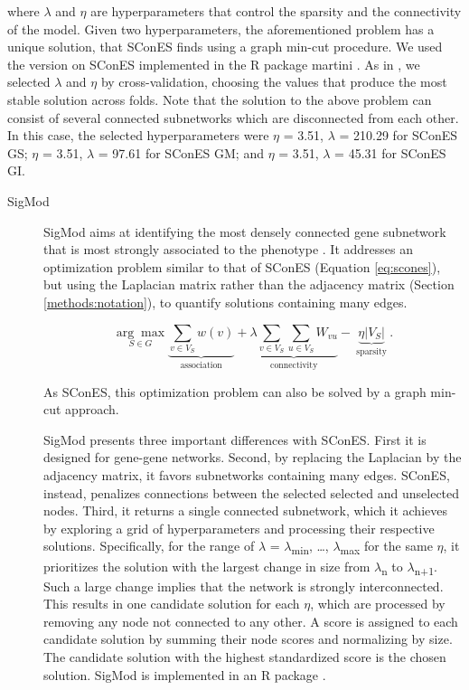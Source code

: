 \documentclass[twocolumn, 10pt]{article}
\begin{document}
\begin{description}
where \(\lambda\) and \(\eta\) are hyperparameters that control the sparsity and the connectivity of the model. Given two hyperparameters, the aforementioned problem has a unique solution, that SConES finds using a graph min-cut procedure. We used the version on SConES implemented in the R package martini \cite{martini}. As in \cite{azencott_efficient_2013}, we selected \(\lambda\) and \(\eta\) by cross-validation, choosing the values that produce the most stable solution across folds. Note that the solution to the above problem can consist of several connected subnetworks which are disconnected from each other. In this case, the selected hyperparameters were \(\eta\) = 3.51, \(\lambda\) = 210.29 for SConES GS; \(\eta\) = 3.51, \(\lambda\) = 97.61 for SConES GM; and \(\eta\) = 3.51, \(\lambda\) = 45.31 for SConES GI.
\end{description}

\begin{description}
\item[{SigMod}] SigMod aims at identifying the most densely connected gene subnetwork that is most strongly associated to the phenotype \cite{liu_sigmod:_2017}. It addresses an optimization problem similar to that of SConES (Equation \ref{eq:scones}), but using the Laplacian matrix rather than the adjacency matrix (Section \ref{methods:notation}), to quantify solutions containing many edges.  

\begin{equation*}
\underset{S \in G}{\arg \max } \underbrace{\sum_{v \in V_S} w(v)}_{\text { association }} + \underbrace{\lambda \sum_{v \in V_S} \sum_{u \in V_S} W_{vu} }_{\text { connectivity }} -\underbrace{\eta \lvert V_S \rvert }_{\text { sparsity }}.
\end{equation*}

As SConES, this optimization problem can also be solved by a graph min-cut approach. 

SigMod presents three important differences with SConES. First it is designed for gene-gene networks. Second, by replacing the Laplacian by the adjacency matrix, it favors subnetworks containing many edges. SConES, instead, penalizes connections between the selected selected and unselected nodes. Third, it returns a single connected subnetwork, which it achieves by exploring a grid of hyperparameters and processing their respective solutions. Specifically, for the range of \(\lambda\) = \(\lambda\)\textsubscript{min}, \dots{}, \(\lambda\)\textsubscript{max} for the same \(\eta\), it prioritizes the solution with the largest change in size from \(\lambda\)\textsubscript{n} to \(\lambda\)\textsubscript{n+1}. Such a large change implies that the network is strongly interconnected. This results in one candidate solution for each \(\eta\), which are processed by removing any node not connected to any other. A score is assigned to each candidate solution by summing their node scores and normalizing by size. The candidate solution with the highest standardized score is the chosen solution. SigMod is implemented in an R package \cite{sigmod}.
\end{description}
\end{document}
